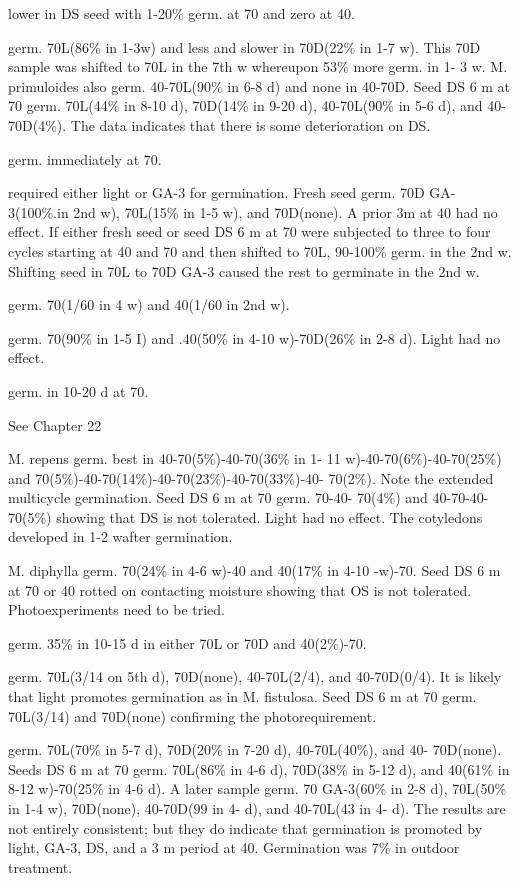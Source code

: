 \begin{description}
lower in DS seed with 1-20\% germ. at 70 and zero at 40.
\item[M. primuloides] germ. 70L(86\% in 1-3w) and less and slower in 70D(22\% in 1-7
w). This 70D sample was shifted to 70L in the 7th w whereupon 53\% more germ. in 1-
3 w. M. primuloides also germ. 40-70L(90\% in 6-8 d) and none in 40-70D. Seed DS 6
m at 70 germ. 70L(44\% in 8-10 d), 70D(14\% in 9-20 d), 40-70L(90\% in 5-6 d), and 40-
70D(4\%). The data indicates that there is some deterioration on DS.
\item[M. puniceus] germ. immediately at 70.
\item[M. ringens] required either light or GA-3 for germination. Fresh seed germ. 70D
GA-3(100\%.in 2nd w), 70L(15\% in 1-5 w), and 70D(none). A prior 3m at 40 had no
effect. If either fresh seed or seed DS 6 m at 70 were subjected to three to four cycles
starting at 40 and 70 and then shifted to 70L, 90-100\% germ. in the 2nd w. Shifting
seed in 70L to 70D GA-3 caused the rest to germinate in the 2nd w.

\item[Minuartia (Caryophyllaceae)]
\item[M. biflora] germ. 70(1/60 in 4 w) and 40(1/60 in 2nd w).
\item[M. laricifolia] germ. 70(90\% in 1-5 I) and .40(50\% in 4-10 w)-70D(26\% in 2-8 d).
Light had no effect.
\item[M. recurva] germ. in 10-20 d at 70.
\item[Miscanthus (Poaceae)] See Chapter 22
\item[Mitchella (Rubiaceae)] M. repens germ. best in 40-70(5\%)-40-70(36\% in 1-
11 w)-40-70(6\%)-40-70(25\%) and 70(5\%)-40-70(14\%)-40-70(23\%)-40-70(33\%)-40-
70(2\%). Note the extended multicycle germination. Seed DS 6 m at 70 germ. 70-40-
70(4\%) and 40-70-40-70(5\%) showing that DS is not tolerated. Light had no effect.
The cotyledons developed in 1-2 wafter germination.
\item[Mitella (Saxifragaceae)] M. diphylla germ. 70(24\% in 4-6 w)-40 and
40(17\% in 4-10 -w)-70. Seed DS 6 m at 70 or 40 rotted on contacting moisture
showing that OS is not tolerated. Photoexperiments need to be tried.

\item[Monarda (Lamiaceae)]
\item[M. citriodora] germ. 35\% in 10-15 d in either 70L or 70D and 40(2\%)-70.
\item[M. didyma] germ. 70L(3/14 on 5th d), 70D(none), 40-70L(2/4), and 40-70D(0/4).
It is likely that light promotes germination as in M. fistulosa. Seed DS 6 m at 70 germ.
70L(3/14) and 70D(none) confirming the photorequirement.
\item[M. fistulosa] germ. 70L(70\% in 5-7 d), 70D(20\% in 7-20 d), 40-70L(40\%), and 40-
70D(none). Seeds DS 6 m at 70 germ. 70L(86\% in 4-6 d), 70D(38\% in 5-12 d), and
40(61\% in 8-12 w)-70(25\% in 4-6 d). A later sample germ. 70 GA-3(60\% in 2-8 d),
70L(50\% in 1-4 w), 70D(none), 40-70D(99 in 4- d), and 40-70L(43 in 4- d). The results
are not entirely consistent; but they do indicate that germination is promoted by light,
GA-3, DS, and a 3 m period at 40. Germination was 7\% in outdoor treatment.


\end{description}
